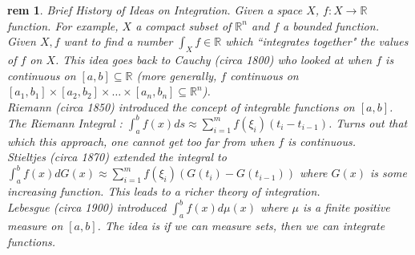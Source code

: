 \documentclass[letterpaper, 12pt]{article}
\newcommand{\fin}{\qquad \quad \hfill \framebox[1.75mm][l]{\,}}
\newcommand{\bR}{\mathbb{R}}
\theoremstyle{stdthm}
\theoremstyle{stddef}
\newtheorem{rem}[thm]{rem} %
\theoremstyle{stdnonum}
\theoremstyle{stdqands}
\theoremstyle{stdbold}
\begin{document}
\begin{rem} {Brief History of Ideas on Integration.}
Given a space $X$, $f:X \rightarrow \bR$ function. For example, $X$ a compact subset of $\bR^n$ and $f$ a bounded function. Given $X,f$ want to find a number $\int_X f \in \bR$ which ``integrates together" the values of $f$ on $X$. This idea goes back to Cauchy (circa 1800) who looked at when $f$ is continuous on $[a,b]\subseteq \bR$ (more generally, $f$ continuous on $[a_1,b_1] \times [a_2,b_2] \times \dots \times [a_n,b_n]\subseteq \bR^n$).   \\

Riemann (circa 1850) introduced the concept of integrable functions on $[a,b]$. The Riemann Integral : $\int_a^b f(x)ds \approx \sum_{i=1}^m f(\xi_i)(t_i - t_{i-1})$. Turns out that which this approach, one cannot get too far from when $f$ is continuous. \\

Stieltjes (circa 1870) extended the integral to $\int_a^b f(x) dG(x) \approx \sum_{i=1}^m f(\xi_i)(G(t_i)- G(t_{i-1}))$ where $G(x)$ is some increasing function. This leads to a richer theory of integration. \\

Lebesgue (circa 1900) introduced $\int_a^b f(x)d\mu (x)$ where $\mu$ is a finite positive measure on $[a,b]$. The idea is if we can measure sets, then we can integrate functions.  
\end{rem}
\end{document}
